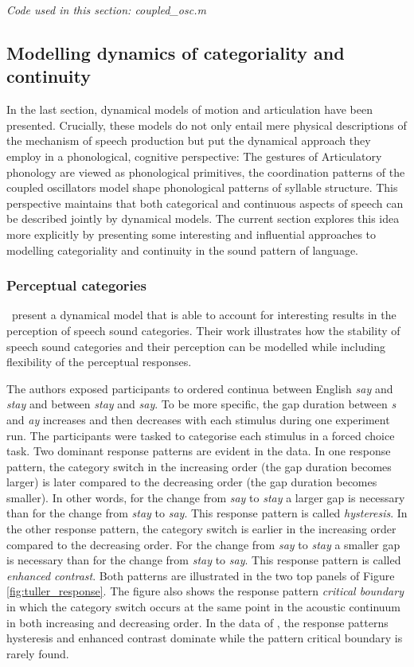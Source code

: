 \medskip\noindent \textit{Code used in this section: coupled\_osc.m}

\subsection{Modelling dynamics of categoriality and continuity}

In the last section, dynamical models of motion and articulation have been presented. Crucially, these models do not only entail mere physical descriptions of the mechanism of speech production but put the dynamical approach they employ in a phonological, cognitive perspective: The gestures of Articulatory phonology are viewed as phonological primitives, the coordination patterns of the coupled oscillators model shape phonological patterns of syllable structure. This perspective maintains that both categorical and continuous aspects of speech can be described jointly by dynamical models. The current section explores this idea more explicitly by presenting some interesting and influential approaches to modelling categoriality and continuity in the sound pattern of language.

\subsubsection{Perceptual categories}

\citet{Tulleretal1994} present a dynamical model that is able to account for interesting results in the perception of speech sound categories. Their work illustrates how the stability of speech sound categories and their perception can be modelled while including flexibility of the perceptual responses.

The authors exposed participants to ordered continua between English \emph{say} and \emph{stay} and between \emph{stay} and \emph{say}. To be more specific, the gap duration between \emph{s} and \emph{ay} increases and then decreases with each stimulus during one experiment run. The participants were tasked to categorise each stimulus in a forced choice task. Two dominant response patterns are evident in the data. In one response pattern, the category switch in the increasing order (the gap duration becomes larger) is later compared to the decreasing order (the gap duration becomes smaller). In other words, for the change from \emph{say} to \emph{stay} a larger gap is necessary than for the change from \emph{stay} to \emph{say}. This response pattern is called \emph{hysteresis}. In the other response pattern, the category switch is earlier in the increasing order compared to the decreasing order. For the change from \emph{say} to \emph{stay} a smaller gap is necessary than for the change from \emph{stay} to \emph{say}. This response pattern is called \emph{enhanced contrast}. Both patterns are illustrated in the two top panels of Figure \ref{fig:tuller_response}. The figure also shows the response pattern \emph{critical boundary} in which the category switch occurs at the same point in the acoustic continuum in both increasing and decreasing order. In the data of \citet{Tulleretal1994}, the response patterns hysteresis and enhanced contrast dominate while the pattern critical boundary is rarely found.

